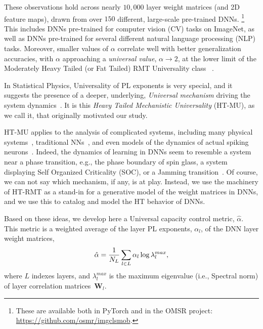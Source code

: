 \vspace{-2mm}

These observations hold across nearly $10,000$ layer weight matrices (and 2D feature maps), drawn from over $150$ different, large-scale pre-trained DNNs.%
\footnote{These are available both in PyTorch and in the OMSR project: \url{https://github.com/osmr/imgclsmob}.}
This includes DNNs pre-trained for computer vision (CV) tasks on ImageNet, as well as DNNs pre-trained for several different natural language processing (NLP) tasks.
Moreover, smaller values of $\alpha$ correlate well with better generalization accuracies, with $\alpha$ approaching a \emph{universal value}, $\alpha\rightarrow 2$, at the lower limit of the Moderately Heavy Tailed (or Fat Tailed) RMT Universality class~\cite{MM18_TR,MM19_HTSR_ICML} .  

In Statistical Physics, Universality of PL exponents is very special, and it suggests the presence of a deeper, underlying, \emph{Universal mechanism} driving the system dynamics~\cite{SornetteBook,BouchaudPotters03}.
It is this \emph{Heavy Tailed Mechanistic Universality} (HT-MU), as we call it, that originally motivated our study.  

HT-MU applies to the analysis of complicated systems, including many physical systems~\cite{SornetteBook}, traditional NNs~\cite{EB01_BOOK,nishimori01}, and even models of the dynamics of actual spiking neurons~\cite{FIBX12}.
Indeed, the dynamics of learning in DNNs
seem to resemble a system near a phase transition, e.g., the phase boundary of spin glass, a system displaying Self Organized Criticality (SOC), or a Jamming transition~\cite{GSdx18_TR,SGd18_TR}. 
Of course, we can not say which mechanism, if any, is at play. 
Instead, we use the machinery of  HT-RMT as a stand-in for a generative model of the weight matrices in DNNs, and we use this to catalog and model the HT behavior of DNNs.%

Based on these ideas, we develop here a Universal capacity control metric, $\hat{\alpha}$.
This metric is a weighted average of the layer PL exponents, $\alpha_{l}$, of the DNN layer weight matrices,
\vspace{-3mm}
\begin{equation}
\hat{\alpha}=\dfrac{1}{N_L}\sum_{l\in L}\alpha_{l}\log\lambda_{l}^{max}  ,
\label{eqn:alpha_hat_specific}
\vspace{-2mm}
\end{equation}
where $L$ indexes layers, and 
$\lambda_{l}^{max}$ is the maximum eigenvalue (i.e., Spectral norm) of layer correlation matrices~$\mathbf{W}_{l}$. 

